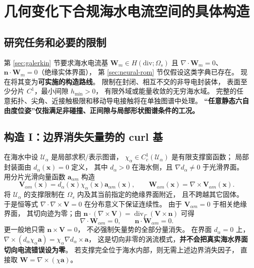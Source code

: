 \section{几何变化下合规海水电流空间的具体构造}\label{sec:admissible-atlas}
\subsection{研究任务和必要的限制}
第 \ref{sec:galerkin} 节要求海水电流基
\(\bm W_m\in H(\mathrm{div};\Omega_s)\) 且
\(\nabla\cdot\bm W_m=0\)、
\(\bm n\cdot\bm W_m=0\)（绝缘实体界面），
第 \ref{sec:neural-rom} 节仅假设这类字典已存在。
现在将其变为\textbf{可实施的构造路线}。
限制在封闭、相互不交的非导电封装体，
表面至少分片 \(C^1\)，最小间隙 \(h_{\min}>0\)，
有限外域或能量收敛的无穷海水域。
完整的任意拓扑、尖角、近接触极限和移动导电接触将在单独图谱中处理。
\textbf{“任意静态六自由度位姿”仅指满足非碰撞、正间隙与局部形状图谱条件的工况。}

\subsection{构造 I：边界消失矢量势的 curl 基}
在海水中设 \(\mathcal U_\alpha\) 是局部求积/表示图谱，
\(\chi_\alpha\in C^1_c(\mathcal U_\alpha)\) 是有限支撑窗函数；
局部封装面由
\(d_\alpha(\bm x)=0\) 定义，
其中 \(d_\alpha>0\) 在海水侧，且
\(\nabla d_\alpha\ne0\) 于光滑界面。
用分片光滑向量函数 \(\bm a_{\alpha m}\) 构造
\begin{equation}
\boxed{
\bm V_{\alpha m}(\bm x)
=d_\alpha(\bm x)\chi_\alpha(\bm x)\bm a_{\alpha m}(\bm x),
\qquad
\bm W_{\alpha m}(\bm x)=\nabla\times\bm V_{\alpha m}(\bm x).
}
\label{eq:curl-atlas}
\end{equation}
将 \(\mathcal U_\alpha\) 的支撑限制在
\(\Omega_s\) 内及其当前指定的绝缘界面附近，
且不跨越其它固体。
于是恒等式 \(\nabla\cdot\nabla\times\bm V=0\)
在分布意义下保证连续性。
由于 \(\bm V_{\alpha m}=0\) 于相关绝缘界面，
其切向迹为零；由
\(\bm n\cdot(\nabla\times\bm V)=
\operatorname{div}_{\Gamma}(\bm V\times\bm n)\)
可得
\begin{equation}
\boxed{\nabla\cdot\bm W_{\alpha m}=0,\qquad
\bm n\cdot\bm W_{\alpha m}=0.}
\label{eq:curl-constraints}
\end{equation}
更一般地只需 \(\bm n\times\bm V=0\)，
不必强制矢量势的全部分量消失。
在界面 \(d_\alpha=0\) 上，
\(\nabla\times(d_\alpha\chi_\alpha\bm a)
=\chi_\alpha\nabla d_\alpha\times\bm a\)，
这是切向非零的涡流模式，\textbf{并不会把真实海水界面切向电流错误设为零}。
若支撑完全位于海水内部，则无需上述边界消失因子，
直接取 \(\bm W=\nabla\times(\chi\bm a)\)。

